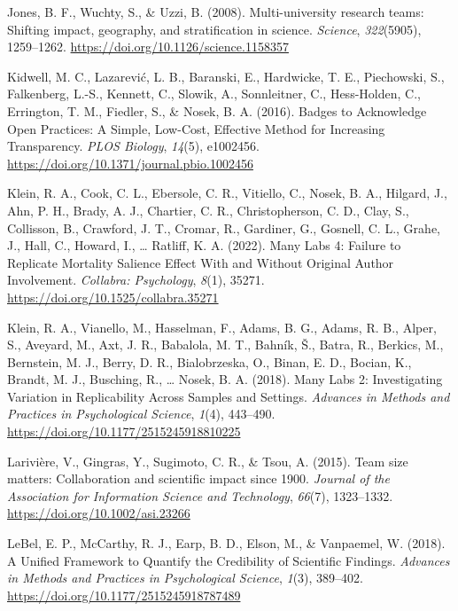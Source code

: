 \documentclass[
  man,floatsintext]{apa7}
\newlength{\cslhangindent}
\newenvironment{CSLReferences}[2] %
 {\begin{list}{}{%
  \setlength{\itemindent}{0pt}
  \setlength{\leftmargin}{0pt}
  \setlength{\parsep}{0pt}
  \ifodd #1
   \setlength{\leftmargin}{\cslhangindent}
   \setlength{\itemindent}{-1\cslhangindent}
  \fi
  \setlength{\itemsep}{#2\baselineskip}}}
 {\end{list}}
\begin{document}
\begin{CSLReferences}{1}{0}
Jones, B. F., Wuchty, S., \& Uzzi, B. (2008). Multi-university research teams: Shifting impact, geography, and stratification in science. \emph{Science}, \emph{322}(5905), 1259--1262. \url{https://doi.org/10.1126/science.1158357}

Kidwell, M. C., Lazarević, L. B., Baranski, E., Hardwicke, T. E., Piechowski, S., Falkenberg, L.-S., Kennett, C., Slowik, A., Sonnleitner, C., Hess-Holden, C., Errington, T. M., Fiedler, S., \& Nosek, B. A. (2016). Badges to Acknowledge Open Practices: A Simple, Low-Cost, Effective Method for Increasing Transparency. \emph{PLOS Biology}, \emph{14}(5), e1002456. \url{https://doi.org/10.1371/journal.pbio.1002456}

Klein, R. A., Cook, C. L., Ebersole, C. R., Vitiello, C., Nosek, B. A., Hilgard, J., Ahn, P. H., Brady, A. J., Chartier, C. R., Christopherson, C. D., Clay, S., Collisson, B., Crawford, J. T., Cromar, R., Gardiner, G., Gosnell, C. L., Grahe, J., Hall, C., Howard, I., \ldots{} Ratliff, K. A. (2022). Many Labs 4: Failure to Replicate Mortality Salience Effect With and Without Original Author Involvement. \emph{Collabra: Psychology}, \emph{8}(1), 35271. \url{https://doi.org/10.1525/collabra.35271}

Klein, R. A., Vianello, M., Hasselman, F., Adams, B. G., Adams, R. B., Alper, S., Aveyard, M., Axt, J. R., Babalola, M. T., Bahník, Š., Batra, R., Berkics, M., Bernstein, M. J., Berry, D. R., Bialobrzeska, O., Binan, E. D., Bocian, K., Brandt, M. J., Busching, R., \ldots{} Nosek, B. A. (2018). Many Labs 2: Investigating Variation in Replicability Across Samples and Settings. \emph{Advances in Methods and Practices in Psychological Science}, \emph{1}(4), 443--490. \url{https://doi.org/10.1177/2515245918810225}

Larivière, V., Gingras, Y., Sugimoto, C. R., \& Tsou, A. (2015). Team size matters: Collaboration and scientific impact since 1900. \emph{Journal of the Association for Information Science and Technology}, \emph{66}(7), 1323--1332. \url{https://doi.org/10.1002/asi.23266}

LeBel, E. P., McCarthy, R. J., Earp, B. D., Elson, M., \& Vanpaemel, W. (2018). A Unified Framework to Quantify the Credibility of Scientific Findings. \emph{Advances in Methods and Practices in Psychological Science}, \emph{1}(3), 389--402. \url{https://doi.org/10.1177/2515245918787489}


\end{CSLReferences}
\end{document}
